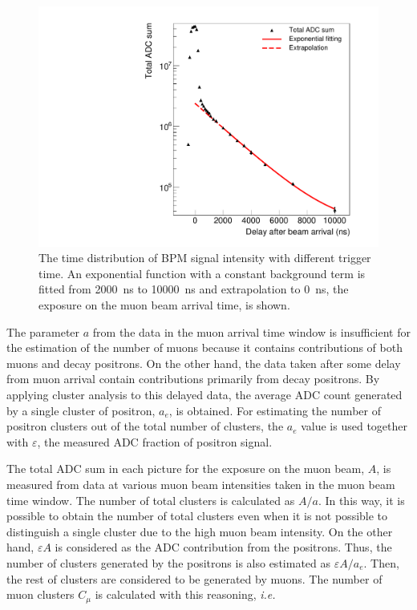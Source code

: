 \documentclass[preprint,3p,twocolumn]{elsarticle}
\begin{document}
\begin{figure}[btp]
	\centering
	\includegraphics[width=\columnwidth]{figure/Decay_v3.pdf}
	\caption{The time distribution of BPM signal intensity
          with different trigger time. An exponential function with a constant background term is
          fitted from \SI{2000}{\ns} to \SI{10000}{\ns} and
          extrapolation to \SI{0}{\ns}, the exposure on the muon beam arrival time, is shown.}
	\label{fig:time_distribution}
\end{figure}

The parameter $a$ from the data in the muon arrival time window
is insufficient for the estimation of the number of muons because
it contains contributions of both muons and decay
positrons. On the other hand, the data taken after some delay
from muon arrival contain contributions primarily from decay
positrons. By applying cluster analysis to this delayed data, the average
ADC count generated by a single cluster of positron, $a_e$, is
obtained. For estimating the number of positron clusters out of
the total number of clusters, the $a_e$ value is used together
with $\varepsilon$, the measured ADC fraction of positron signal.

The total ADC sum in each picture for the exposure on the muon beam, $A$, is measured from data at
various muon beam intensities taken in the muon
beam time window.  The number of total clusters is calculated as $A/a$. In
this way, it is possible to obtain the number of total clusters
even when it is not possible to distinguish a single cluster due
to the high muon beam intensity.  On the other hand,
$\varepsilon A$ is considered as the ADC contribution from the
positrons. Thus, the number of clusters generated by the
positrons is also estimated as $\varepsilon A/a_e$. Then, the
rest of clusters are considered to be generated by muons. The
number of muon clusters $C_{\mu}$ is calculated with this
reasoning, {\it i.e.}
\end{document}
